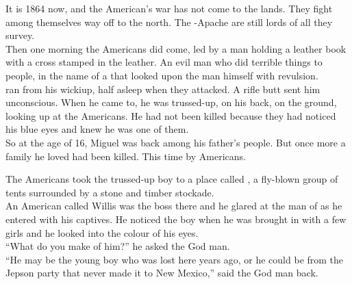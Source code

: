 


It is 1864 now, and the American's war has not come to the  lands. They fight among themselves way off to the north. The -Apache are still lords of all they survey. \\

Then one morning the Americans did come, led by a man holding a leather book with a cross stamped in the leather. An evil man who did terrible things to people, in the name of a  that looked upon the man himself with revulsion. \\

 ran from his wickiup, half asleep when they attacked. A rifle butt sent him unconscious. When he came to, he was trussed-up, on his back, on the ground, looking up at the Americans. He had not been killed because they had noticed his blue eyes and knew he was one of them. \\

So at the age of 16, Miguel was back among his father's people. But once more a family he loved had been killed. This time by Americans. \\





The Americans took the trussed-up boy to a place called , a fly-blown group of tents surrounded by a stone and timber stockade. \\

An American called Willis was the boss there and he glared at the man of  as he entered with his captives. He noticed the boy when he was brought in with a few  girls and he looked into the colour of his eyes. \\

``What do you make of him?'' he asked the God man. \\
``He may be the young  boy who was lost here years ago, or he could be from the Jepson party that never made it to New Mexico,'' said the God man back. \\

